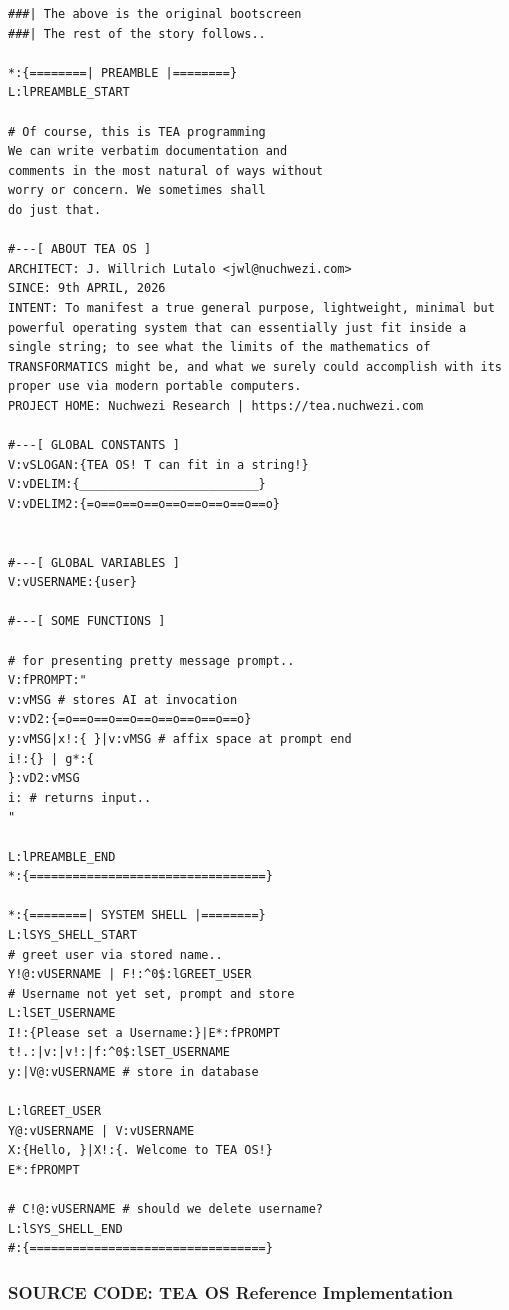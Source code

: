 \documentclass[a4paper, 18pt]{book} %
\begin{document}
{{{{\begin{tcolorbox}[teaterminalstyle, title=TEA Program: TOS Complete Source-Code, breakable]
\begin{lstlisting}[language=TEA,breaklines=true,]
###| The above is the original bootscreen
###| The rest of the story follows..

*:{========| PREAMBLE |========}
L:lPREAMBLE_START

# Of course, this is TEA programming
We can write verbatim documentation and 
comments in the most natural of ways without
worry or concern. We sometimes shall 
do just that. 

#---[ ABOUT TEA OS ]
ARCHITECT: J. Willrich Lutalo <jwl@nuchwezi.com>
SINCE: 9th APRIL, 2026
INTENT: To manifest a true general purpose, lightweight, minimal but powerful operating system that can essentially just fit inside a single string; to see what the limits of the mathematics of TRANSFORMATICS might be, and what we surely could accomplish with its proper use via modern portable computers.
PROJECT HOME: Nuchwezi Research | https://tea.nuchwezi.com

#---[ GLOBAL CONSTANTS ]
V:vSLOGAN:{TEA OS! T can fit in a string!}
V:vDELIM:{_________________________}
V:vDELIM2:{=o==o==o==o==o==o==o==o==o}


#---[ GLOBAL VARIABLES ]
V:vUSERNAME:{user}

#---[ SOME FUNCTIONS ]

# for presenting pretty message prompt..
V:fPROMPT:"
v:vMSG # stores AI at invocation
v:vD2:{=o==o==o==o==o==o==o==o==o}
y:vMSG|x!:{ }|v:vMSG # affix space at prompt end
i!:{} | g*:{
}:vD2:vMSG
i: # returns input..
"

L:lPREAMBLE_END
*:{=================================}

*:{========| SYSTEM SHELL |========}
L:lSYS_SHELL_START
# greet user via stored name..
Y!@:vUSERNAME | F!:^0$:lGREET_USER
# Username not yet set, prompt and store
L:lSET_USERNAME
I!:{Please set a Username:}|E*:fPROMPT
t!.:|v:|v!:|f:^0$:lSET_USERNAME
y:|V@:vUSERNAME # store in database

L:lGREET_USER
Y@:vUSERNAME | V:vUSERNAME
X:{Hello, }|X!:{. Welcome to TEA OS!}
E*:fPROMPT

# C!@:vUSERNAME # should we delete username?
L:lSYS_SHELL_END
#:{=================================}
   \end{lstlisting}
  \end{tcolorbox}
  \caption{TEA PROGRAM: TEA Operating System v1.0.1}
  \label{FIGTOS1}
}


\vspace{2em}


\subsubsection{SOURCE CODE: TEA OS Reference Implementation}
\label{TEAOSSRC}

}}}
\end{document}
